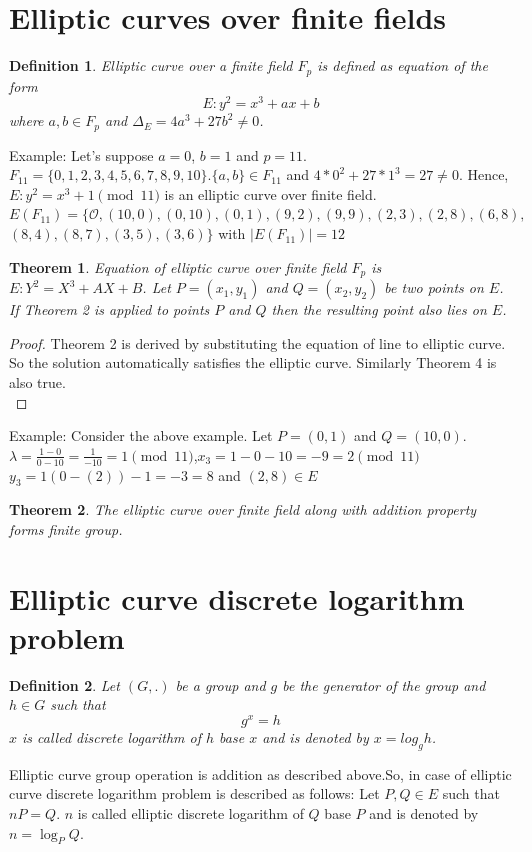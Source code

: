 \documentclass[a4paper,12pt]{report}
\newtheorem{theorem}{Theorem}
\newtheorem{definition}{Definition}
\begin{document}
\section{Elliptic curves over finite fields}
\begin{definition}
	Elliptic curve over a finite field $F_p$ is defined as equation of the form $$E:y^2 = x^3+ax+b$$ where $a,b\in F_p$ and $\Delta_E = 4a^3+27b^2\neq 0$.
\end{definition}
Example:
Let's suppose $a=0$, $b=1$ and $p=11$. \\
$F_{11}=\{0,1,2,3,4,5,6,7,8,9,10\}$.$\{a,b\}\in F_{11}$ and $4*0^2+27*1^3=27\neq 0$. Hence, $E:y^2 = x^3+1 \pmod {11} $ is an elliptic curve over finite field. \\
$E(F_{11}) = \{\mathscr{O},(10,0),(0,10),(0,1),(9,2),(9,9),(2,3),(2,8),(6,8),$\\$(8,4),(8,7),(3,5),(3,6)\}$
with $|E(F_{11})|=12$
\begin{theorem}
	Equation of elliptic curve over finite field $F_p$ is $E : Y^2=X^3+
		AX+B$. Let $P=(x_1,y_1)$ and $Q=(x_2,y_2)$ be two points on $E$. If Theorem 2 is applied to points $P$ and $Q$ then the resulting point also lies on $E$.
\end{theorem}
\begin{proof}
	Theorem 2 is derived by substituting the equation of line to elliptic curve. So the solution automatically satisfies the elliptic curve. Similarly Theorem 4 is also true.\\
\end{proof}
Example: Consider the above example. Let $P=(0,1)$ and $Q=(10,0)$.
$\lambda = \frac{1-0}{0-10} = \frac{1}{-	10} = 1 \pmod{11}$,$x_3=1-0-10=-9=2 \pmod{11}$\\ $y_3=1(0-(2))-1=-3=8$ and $(2,8) \in E$ \begin{theorem}
	The elliptic curve over finite field along with addition property forms finite group.
\end{theorem}

\cleardoublepage
\section{Elliptic curve discrete logarithm problem}

\begin{definition}
	Let $(G,.)$ be a group and $g$ be the generator of the group and $h\in G$ such that $$g^x=h$$
	$x$ is called discrete logarithm of $h$ base $x$ and is denoted by $x=log_g h$.
\end{definition}
Elliptic curve group operation is addition as described above.So, in case of elliptic curve discrete logarithm problem is described as follows:
Let $P,Q \in E$ such that $nP=Q$. $n$ is called elliptic discrete logarithm of $Q$ base $P$ and is denoted by $n =\log_P Q$.
\end{document}
